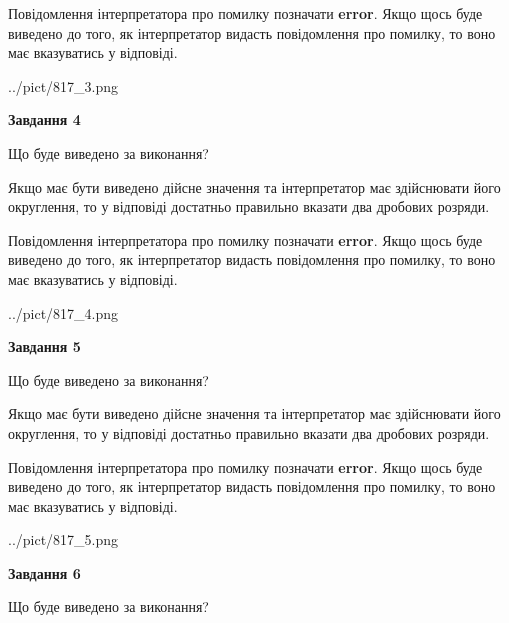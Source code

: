\documentclass[12pt, ukrainian]{article}
\begin{document}
{\begin {Large}
Повідомлення інтерпретатора про помилку позначати \textbf{error}.
Якщо щось буде виведено до того, як інтерпретатор видасть повідомлення про помилку, 
то воно має вказуватись у відповіді. \par

\begin{center}
	{../pict/817_3.png}
\end{center}
\newpage

{\begin {center}\textbf{Завдання 4}\end {center}}\par
Що буде виведено за виконання? \par

Якщо має бути виведено дійсне значення та інтерпретатор має здійснювати його округлення, 
то у відповіді достатньо правильно вказати два дробових розряди.

Повідомлення інтерпретатора про помилку позначати \textbf{error}.
Якщо щось буде виведено до того, як інтерпретатор видасть повідомлення про помилку, 
то воно має вказуватись у відповіді. \par

\begin{center}
	{../pict/817_4.png}
\end{center}
\newpage

{\begin {center}\textbf{Завдання 5}\end {center}}\par
Що буде виведено за виконання? \par

Якщо має бути виведено дійсне значення та інтерпретатор має здійснювати його округлення, 
то у відповіді достатньо правильно вказати два дробових розряди.

Повідомлення інтерпретатора про помилку позначати \textbf{error}.
Якщо щось буде виведено до того, як інтерпретатор видасть повідомлення про помилку, 
то воно має вказуватись у відповіді. \par

\begin{center}
	{../pict/817_5.png}
\end{center}
\newpage

{\begin {center}\textbf{Завдання 6}\end {center}}\par
Що буде виведено за виконання? \par


\end{Large}}
\end{document}
